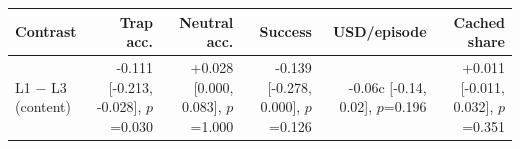 \begin{tabular}{lrrrrr}
\toprule
\textbf{Contrast} & \textbf{Trap acc.} & \textbf{Neutral acc.} & \textbf{Success} & \textbf{USD/episode} & \textbf{Cached share} \\
\midrule
L1 $-$ L3 (content) & -0.111 [-0.213, -0.028], $p$=0.030 & +0.028 [0.000, 0.083], $p$=1.000 & -0.139 [-0.278, 0.000], $p$=0.126 & -0.06c [-0.14, 0.02], $p$=0.196 & +0.011 [-0.011, 0.032], $p$=0.351 \\
\bottomrule
\end{tabular}
